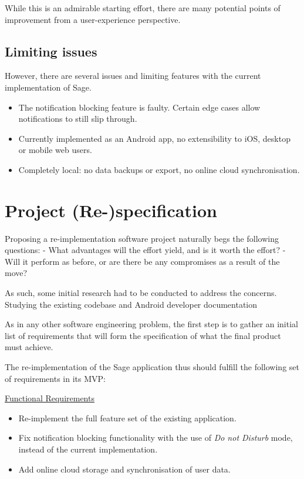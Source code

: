 While this is an admirable starting effort, there are many potential points of improvement from a user-experience perspective.

\subsection{Limiting issues}
However, there are several issues and limiting features with the current implementation of Sage.

\begin{itemize}
    \item The notification blocking feature is faulty. Certain edge cases allow notifications to still slip through.
    \item Currently implemented as an Android app, no extensibility to iOS, desktop or mobile web users.
    \item Completely local: no data backups or export, no online cloud synchronisation.
\end{itemize}





\section{Project (Re-)specification}
Proposing a re-implementation software project naturally begs the following questions:
- What advantages will the effort yield, and is it worth the effort?
- Will it perform as before, or are there be any compromises as a result of the move?

As such, some initial research had to be conducted to address the concerns.
Studying the existing codebase and Android developer documentation

As in any other software engineering problem, the first step is to gather an initial list of requirements that will form the specification of what the final product must achieve.

The re-implementation of the Sage application thus should fulfill the following set of requirements in its MVP:

\underline{Functional Requirements}
\begin{itemize}
    \item Re-implement the full feature set of the existing application.
    \item Fix notification blocking functionality with the use of \textit{Do not Disturb} mode, instead of the current implementation.
    \item Add online cloud storage and synchronisation of user data.
\end{itemize}

